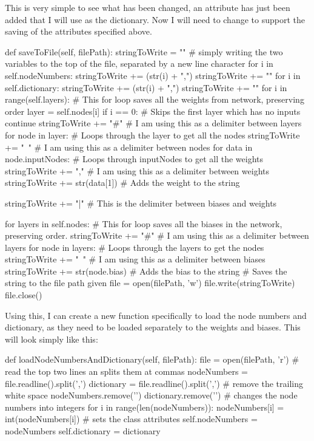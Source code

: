\documentclass{report}
\begin{document}
This is very simple to see what has been changed, an attribute has just been added that I will use as the dictionary.
\newline
Now I will need to change  to support the saving of the attributes specified above.
\begin{python}
def saveToFile(self, filePath):
    stringToWrite = ""
    # simply writing the two variables to the top of the file, separated by a new line character
    for i in self.nodeNumbers:
        stringToWrite += (str(i) + ",")
    stringToWrite += "\n"
    for i in self.dictionary:
        stringToWrite += (str(i) + ",")
    stringToWrite += "\n"
    for i in range(self.layers):  # This for loop saves all the weights from network, preserving order
        layer = self.nodes[i]
        if i == 0:  # Skips the first layer which has no inputs
            continue
        stringToWrite += "#"  # I am using this as a delimiter between layers
        for node in layer:  # Loops through the layer to get all the nodes
            stringToWrite += "~"  # I am using this as a delimiter between nodes
            for data in node.inputNodes:  # Loops through inputNodes to get all the weights
                stringToWrite += ","  # I am using this as a delimiter between weights
                stringToWrite += str(data[1])  # Adds the weight to the string

    stringToWrite += "|"  # This is the delimiter between biases and weights

    for layers in self.nodes:  # This for loop saves all the biases in the network, preserving order.
        stringToWrite += "#"  # I am using this as a delimiter between layers
        for node in layers:  # Loops through the layers to get the nodes
            stringToWrite += "~"  # I am using this as a delimiter between biases
            stringToWrite += str(node.bias)  # Adds the bias to the string
    # Saves the string to the file path given
    file = open(filePath, 'w')
    file.write(stringToWrite)
    file.close()
\end{python}
Using this, I can create a new function specifically to load the node numbers and dictionary, as they need to be loaded separately to the weights and biases. This will look simply like this:
\begin{python}
def loadNodeNumbersAndDictionary(self, filePath):
    file = open(filePath, 'r')
    # read the top two lines an splits them at commas
    nodeNumbers = file.readline().split(',') 
    dictionary = file.readline().split(',')
    # remove the trailing white space
    nodeNumbers.remove('\n')
    dictionary.remove('\n')
    # changes the node numbers into integers
    for i in range(len(nodeNumbers)):
        nodeNumbers[i] = int(nodeNumbers[i])
    # sets the class attributes
    self.nodeNumbers = nodeNumbers
    self.dictionary = dictionary
\end{python}
\end{document}
